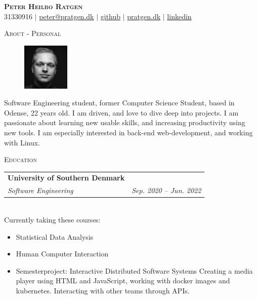 \documentclass[11pt]{article}
\makeatletter
\newcommand{\resumeSubheading}[4]{
  \noindent\begin{tabular*}{0.98\textwidth}[t]{l@{\extracolsep{\fill}}r}
    \noindent \textbf{#1} & #2 \\ \vspace{-3pt} 
    \noindent \textit{\small#3} & \textit{\small #4} 
  \end{tabular*}\vspace{7pt}
}
\makeatother
\begin{document}
\begin{center}
  \textbf{\huge{\scshape{Peter Heilbo Ratgen}}}\\ 
  \vspace{0.2cm}
  \small 31330916 $|$
  \href{mailto:peter@pratgen.dk}{\underline{peter@pratgen.dk}} $|$
  \href{https://github.com/PeterRatgen }{\underline{github}} $|$
  \href{https://pratgen.dk}{\underline{pratgen.dk}} $|$
  \href{https://www.linkedin.com/in/peter-ratgen-a1236529/}{\underline{linkedin}}
\end{center}

\noindent\large{\scshape{About - Personal}} \newline
\noindent{\rule[0.3cm]{\textwidth}{0.4pt}}

\begin{figure}
  \vspace{-0.7cm}
  \includegraphics[width=0.2\textwidth, right]{./okay.jpg}
\end{figure}
\normalsize Software Engineering student, former Computer Science Student, based in Odense,
22 years old. I am driven, and love to dive deep into projects. I am passionate
about learning new usable skills, and increasing productivity using new tools. I
am especially interested in back-end web-development, and working with Linux. 

\vspace{0.3cm}
\noindent\large{\scshape{Education}} \newline
\noindent{\rule[0.3cm]{\textwidth}{0.4pt}}

\resumeSubheading{University of Southern Denmark}{}{Software Engineering}{Sep.
2020 -- Jun. 2022}\\\vspace{0.25cm}
{\indent\small Currently taking these courses:}
  \vspace{-0.3cm}
  {\small 
  \begin{itemize}
  \setlength{\itemsep}{-1pt}
    \item Statistical Data Analysis
    \item Human Computer Interaction
    \item Semesterproject: Interactive Distributed Software Systems
      \subitem Creating a media player using HTML and JavaScript, working with
      docker images and kubernetes. Interacting with other teams through APIs.
\end{itemize}} \vspace{0.3cm}
\end{document}
